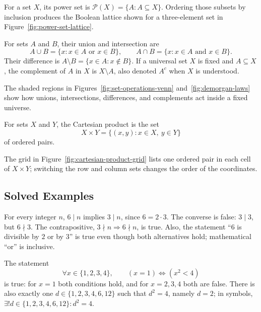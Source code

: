 For a set $X$, its power set is $\mathcal{P}(X)=\{A:A\subseteq X\}$. Ordering those subsets by inclusion produces the Boolean lattice shown for a three-element set in Figure~\ref{fig:power-set-lattice}.


\begin{definition}
For sets $A$ and $B$, their union and intersection are
\[
 A\cup B=\{x:x\in A\text{ or }x\in B\},\qquad
 A\cap B=\{x:x\in A\text{ and }x\in B\}.
\]
Their difference is $A\setminus B=\{x\in A:x\notin B\}$. If a universal set $X$ is fixed and $A\subseteq X$, the complement of $A$ in $X$ is $X\setminus A$, also denoted $A^c$ when $X$ is understood.
\end{definition}

The shaded regions in Figures~\ref{fig:set-operations-venn} and~\ref{fig:demorgan-laws} show how unions, intersections, differences, and complements act inside a fixed universe.



\begin{definition}
For sets $X$ and $Y$, the Cartesian product is the set
\[
 X\times Y=\{(x,y):x\in X,\ y\in Y\}
\]
of ordered pairs.
\end{definition}

The grid in Figure~\ref{fig:cartesian-product-grid} lists one ordered pair in each cell of $X\times Y$; switching the row and column sets changes the order of the coordinates.


\subsection{Solved Examples}

\begin{example}
For every integer $n$, $6\mid n$ implies $3\mid n$, since $6=2\cdot3$. The converse is false: $3\mid3$, but $6\nmid3$. The contrapositive, $3\nmid n\Rightarrow6\nmid n$, is true. Also, the statement “$6$ is divisible by $2$ or by $3$” is true even though both alternatives hold; mathematical “or” is inclusive.
\end{example}

\begin{example}
The statement
\[
  \forall x\in\{1,2,3,4\},\qquad
  (x=1)\Longleftrightarrow(x^2<4)
\]
is true: for $x=1$ both conditions hold, and for $x=2,3,4$ both are false. There is also exactly one $d\in\{1,2,3,4,6,12\}$ such that $d^2=4$, namely $d=2$; in symbols, $\exists!d\in\{1,2,3,4,6,12\}:d^2=4$.
\end{example}

